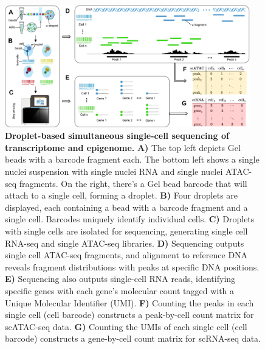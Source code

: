 \begin{figure}[!ht]
	\centering
	\includegraphics[width=0.95\textwidth]{Sequencing/fig}
	\vspace{0.1cm}
	\caption[Droplet-based simultaneous single-cell sequencing of transcriptome and epigenome.]{\textbf{Droplet-based simultaneous single-cell sequencing of transcriptome and epigenome.} \textbf{A)} The top left depicts Gel beads with a barcode fragment each. The bottom left shows a single nuclei suspension with single nuclei RNA and single nuclei ATAC-seq fragments. On the right, there's a Gel bead barcode that will attach to a single cell, forming a droplet. \textbf{B)} Four droplets are displayed, each containing a bead with a barcode fragment and a single cell. Barcodes uniquely identify individual cells. \textbf{C)} Droplets with single cells are isolated for sequencing, generating single cell RNA-seq and single ATAC-seq libraries. \textbf{D)} Sequencing outputs single cell ATAC-seq fragments, and alignment to reference DNA reveals fragment distributions with peaks at specific DNA positions. \textbf{E)} Sequencing also outputs single-cell RNA reads, identifying specific genes with each gene's molecular count tagged with a Unique Molecular Identifier (UMI). \textbf{F)} Counting the peaks in each single cell (cell barcode) constructs a peak-by-cell count matrix for scATAC-seq data. \textbf{G)} Counting the UMIs of each single cell (cell barcode) constructs a gene-by-cell count matrix for scRNA-seq data.}
	\label{fig:scRNA_scATAC_to_count_matrix}
\end{figure}

